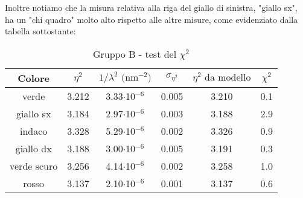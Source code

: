 Inoltre notiamo che la misura relativa alla riga del giallo di sinistra, "giallo sx", ha un "chi quadro" molto alto rispetto alle altre misure, come evidenziato dalla tabella sottostante:
\begin{table}[!htbp]
    {\par\centering
    \begin{tabular}{cccccc}
        \hline
            Colore &
            $\eta^2$ &
            $1/\lambda^2 \text{ (nm$^{-2}$)}$ &
            $\sigma_{\eta^2}$ &
            $\eta^2 \text{ da modello}$ &
            $\chi^2$\\
        \hline
        verde       &   3.212   &   3.33$\cdot$10$^{-6}$  & 0.005   &   3.210   &   0.1\\
        giallo sx   &   3.184   &   2.97$\cdot$10$^{-6}$  & 0.003   &   3.188   &   2.9\\
        indaco      &   3.328   &   5.29$\cdot$10$^{-6}$  & 0.002   &   3.326   &   0.9\\
        giallo dx   &   3.188   &   3.00$\cdot$10$^{-6}$  & 0.005   &   3.191   &   0.3\\
        verde scuro &   3.256   &   4.14$\cdot$10$^{-6}$  & 0.002   &   3.258   &   1.0\\
        rosso       &   3.137   &   2.10$\cdot$10$^{-6}$  & 0.001   &   3.137   &   0.6\\
        \hline
    \end{tabular}
    \par}
    \caption{Gruppo B - test del $\chi^2$}
\end{table}

